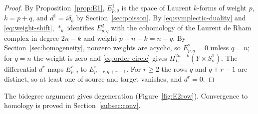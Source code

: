 \documentclass[11pt,oneside,reqno]{article}
\theoremstyle{plain}
\theoremstyle{definition}
\theoremstyle{remark}
\begin{document}
\begin{proof}
By Proposition~\ref{prop:E1}, \(E^1_{p,q}\) is the space of Laurent
\(k\)-forms of weight \(p\), \(k=p+q\), and \(d^1=i\delta_b\) by
Section~\ref{sec:poisson}. By \eqref{eq:symplectic-duality} and
\eqref{eq:weight-shift}, \(*_b\) identifies \(E^2_{p,q}\) with the
cohomology of the Laurent de Rham complex in degree \(2n-k\) and weight
\(p+n-k=n-q\). By Section~\ref{sec:homogeneity}, nonzero weights are
acyclic, so \(E^2_{p,q}=0\) unless \(q=n\); for \(q=n\) the weight is zero
and \eqref{eq:order-circle} gives \(H_L^{2n-k}(Y\times S^1_\sigma)\).
The differential \(d^r\) maps \(E^r_{p,q}\) to \(E^r_{p-r,q+r-1}\). For
\(r\geq2\) the rows \(q\) and \(q+r-1\) are distinct, so at least one of
source and target vanishes, and \(d^r=0\).
\end{proof}

The bidegree argument gives degeneration (Figure~\ref{fig:E2row}).
Convergence to homology is proved in Section~\ref{subsec:conv}.
\end{document}

